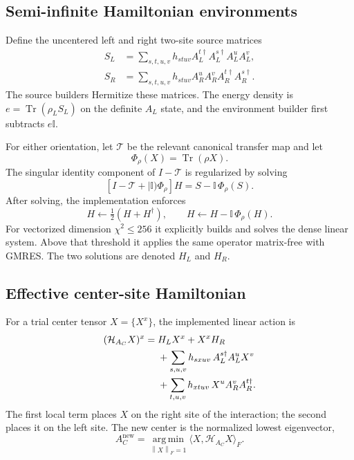 \documentclass[11pt]{article}
\newcommand{\Id}{\mathbb{I}}
\newcommand{\Tr}{\operatorname{Tr}}
\newcommand{\argmin}{\operatorname*{arg\,min}}
\newcommand{\norm}[1]{\left\lVert #1\right\rVert}
\begin{document}
\subsection{Semi-infinite Hamiltonian environments}

Define the uncentered left and right two-site source matrices
\begin{align}
  S_L
  &=
  \sum_{s,t,u,v}h_{stuv}
  A_L^{t\dagger}A_L^{s\dagger}A_L^uA_L^v,
  \label{eq:vumps-left-source}\\
  S_R
  &=
  \sum_{s,t,u,v}h_{stuv}
  A_R^uA_R^vA_R^{t\dagger}A_R^{s\dagger}.
  \label{eq:vumps-right-source}
\end{align}
The source builders Hermitize these matrices.  The energy density is
$e=\Tr(\rho_L S_L)$ on the definite $A_L$ state, and the environment builder
first subtracts $e\Id$.

For either orientation, let $\mathcal T$ be the relevant canonical transfer
map and let
\begin{equation}
  \Phi_\rho(X)=\Tr(\rho X).
  \label{eq:rho-functional}
\end{equation}
The singular identity component of $I-\mathcal T$ is regularized by solving
\begin{equation}
  \left[
    I-\mathcal T+|\Id)\Phi_\rho
  \right]H
  =
  S-\Id\,\Phi_\rho(S).
  \label{eq:vumps-environment-equation}
\end{equation}
After solving, the implementation enforces
\begin{equation}
  H\leftarrow\tfrac12(H+H^\dagger),
  \qquad
  H\leftarrow H-\Id\,\Phi_\rho(H).
  \label{eq:vumps-environment-gauge}
\end{equation}
For vectorized dimension $\chi^2\leq256$ it explicitly builds and solves the
dense linear system.  Above that threshold it applies the same operator
matrix-free with GMRES.  The two solutions are denoted $H_L$ and $H_R$.

\subsection{Effective center-site Hamiltonian}

For a trial center tensor $X=\{X^x\}$, the implemented linear action is
\begin{align}
  (\mathcal H_{A_C}X)^x
  ={}&
  H_LX^x+X^xH_R
  \notag\\
  &+\sum_{s,u,v}
    h_{s x u v}\,
    A_L^{s\dagger}A_L^uX^v
  \notag\\
  &+\sum_{t,u,v}
    h_{x t u v}\,
    X^uA_R^vA_R^{t\dagger}.
  \label{eq:vumps-effective-center}
\end{align}
The first local term places $X$ on the right site of the interaction; the
second places it on the left site.  The new center is the normalized lowest
eigenvector,
\begin{equation}
  A_C^{\mathrm{new}}
  =
  \argmin_{\norm{X}_F=1}
  \langle X,\mathcal H_{A_C}X\rangle_F.
  \label{eq:vumps-center-eigenproblem}
\end{equation}
\end{document}
